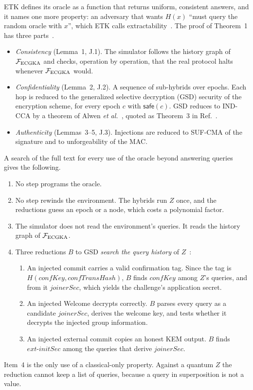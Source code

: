 \documentclass[aps,prx,reprint,superscriptaddress,nofootinbib,floatfix]{revtex4-2}
\theoremstyle{remark}
\newcommand{\F}{\mathcal F_{\rm ECGKA}}
\begin{document}
ETK defines its oracle as a function that returns uniform, consistent answers, and it names one more property: an adversary that wants $H(x)$ ``must query the random oracle with $x$'', which ETK calls extractability~\cite[App.~B.4]{etk}. The proof of Theorem~1 has three parts~\cite[App.~J]{etk}.
\begin{itemize}
\item \emph{Consistency} (Lemma~1, J.1). The simulator follows the history graph of $\F$ and checks, operation by operation, that the real protocol halts whenever $\F$ would.
\item \emph{Confidentiality} (Lemma~2, J.2). A sequence of sub-hybrids over epochs. Each hop is reduced to the generalized selective decryption (GSD) security of the encryption scheme, for every epoch $c$ with $\mathsf{safe}(c)$. GSD reduces to IND-CCA by a theorem of Alwen \emph{et al.}~\cite{active-cgka}, quoted as Theorem~3 in Ref.~\cite{etk}.
\item \emph{Authenticity} (Lemmas~3--5, J.3). Injections are reduced to SUF-CMA of the signature and to unforgeability of the MAC.
\end{itemize}

A search of the full text for every use of the oracle beyond answering queries gives the following.
\begin{enumerate}
\item No step programs the oracle.
\item No step rewinds the environment. The hybrids run $Z$ once, and the reductions guess an epoch or a node, which costs a polynomial factor.
\item The simulator does not read the environment's queries. It reads the history graph of $\F$.
\item Three reductions $B$ to GSD \emph{search the query history} of $Z$~\cite[pp.~78--81]{etk}:
\begin{enumerate}
\item[(E1)] An injected commit carries a valid confirmation tag. Since the tag is $H(\mathit{confKey},\mathit{confTransHash})$, $B$ finds $\mathit{confKey}$ among $Z$'s queries, and from it $\mathit{joinerSec}$, which yields the challenge's application secret.
\item[(E2)] An injected Welcome decrypts correctly. $B$ parses every query as a candidate $\mathit{joinerSec}$, derives the welcome key, and tests whether it decrypts the injected group information.
\item[(E3)] An injected external commit copies an honest KEM output. $B$ finds $\mathit{ext\text{-}initSec}$ among the queries that derive $\mathit{joinerSec}$.
\end{enumerate}
\end{enumerate}
Item~4 is the only use of a classical-only property. Against a quantum $Z$ the reduction cannot keep a list of queries, because a query in superposition is not a value.
\end{document}
